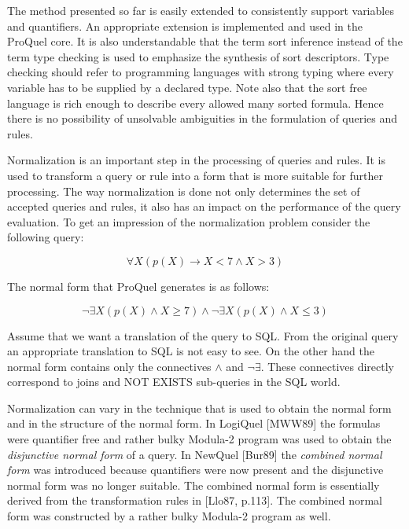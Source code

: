 The method presented so far is easily extended to consistently support variables and
quantifiers. An appropriate extension is implemented and used in the ProQuel core. It is 
also understandable that the term sort inference instead of the term type checking is used 
to emphasize the synthesis of sort descriptors. Type checking should refer to programming 
languages with strong typing where every variable has to be supplied by a declared type. 
Note also that the sort free language is rich enough to describe every allowed many sorted 
formula. Hence there is no possibility of unsolvable ambiguities in the formulation of 
queries and rules.

\label{secnorm}
Normalization is an important step in the processing of queries and rules. It is used to 
transform a query or rule into a form that is more suitable for further processing. The 
way normalization is done not only determines the set of accepted queries and rules, it
also has an impact on the performance of the query evaluation. To get an impression of the 
normalization problem consider the following query:

\begin{displaymath}
\forall X(p(X) \rightarrow X<7 \wedge X>3)
\end{displaymath}

The normal form that ProQuel generates is as follows:

\begin{displaymath}
\neg \exists X(p(X) \wedge X\geq 7) \wedge
\neg \exists X(p(X) \wedge X\leq 3)
\end{displaymath}

Assume that we want a translation of the query to SQL. From the original query an appropriate
translation to SQL is not easy to see. On the other hand the normal form contains only the
connectives $\wedge$ and $\neg\exists$. These connectives directly correspond to joins and
NOT EXISTS sub-queries in the SQL world.

Normalization can vary in the technique that is used to obtain the normal form and in the
structure of the normal form. In LogiQuel [MWW89] the formulas were quantifier free and 
rather bulky Modula-2 program was used to obtain the {\em disjunctive normal form} of a query. 
In NewQuel [Bur89] the {\em combined normal form} was introduced because quantifiers were now
present and the disjunctive normal form was no longer suitable. The combined normal form is 
essentially derived from the transformation rules in [Llo87, p.113]. The combined normal form 
was constructed by a rather bulky Modula-2 program as well.

